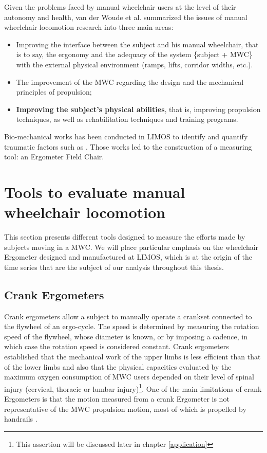 Given the problems faced by manual wheelchair users at the level of
their autonomy and health, van der Woude et al. \cite{van2005wheelchair} \cite{woude1986wheelchair} summarized the issues of manual wheelchair locomotion research into three main areas:

\begin{itemize}
\item Improving the interface between the subject and his manual wheelchair, that is to say, the ergonomy and the adequacy of the system \{subject + MWC\} with the external physical environment (ramps, lifts, corridor widths, etc.).
\item The improvement of the MWC regarding the design and the mechanical principles of propulsion;
\item \textbf{Improving the subject's physical abilities}, that is, improving propulsion techniques, as well as rehabilitation techniques and training programs.
\end{itemize}

Bio-mechanical works has been conducted in LIMOS to identify and quantify traumatic factors such as \cite{Remy2005}  \cite{Sauret2010}. Those works led to the construction of a measuring tool: an Ergometer Field Chair.

\section[Evaluation tools]{Tools to evaluate manual wheelchair locomotion}
This section presents different tools designed to measure the efforts made by subjects moving in a MWC. We will place particular emphasis on the wheelchair  Ergometer designed and manufactured at LIMOS, which is at the origin of the time series that are the subject of our analysis throughout this thesis.

\subsection{Crank Ergometers}
Crank ergometers allow a subject to manually operate a crankset connected to the flywheel of an ergo-cycle. The speed is determined by measuring the rotation speed of the flywheel, whose diameter is known, or by imposing a cadence, in which case the rotation speed is considered constant. Crank ergometers established that the mechanical work of the upper limbs is less efficient than that of the lower limbs and also that the physical capacities evaluated by the maximum oxygen consumption of MWC users depended on their level of spinal injury (cervical, thoracic or lumbar injury)\footnote{This assertion will be discussed later in chapter \ref{application}}. One of the main limitations of crank Ergometers is that the motion measured from a crank Ergometer is not representative of the MWC propulsion motion, most of which is propelled by handrails \cite{0aastrand1961maximal}  \cite{bergh1976maximal}    \cite{stenberg1967hemodynamic}.

